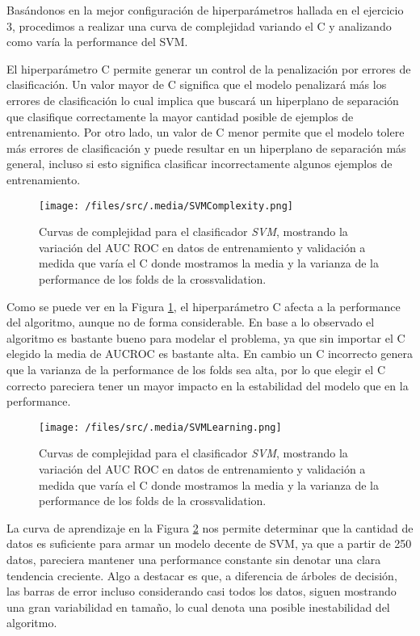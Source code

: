Basándonos en la mejor configuración de hiperparámetros hallada en el ejercicio 3, procedimos a realizar una curva de complejidad variando el C y analizando como varía la performance del SVM. 

El hiperparámetro C permite generar un control de la penalización por errores de clasificación. Un valor mayor de C significa que el modelo penalizará más los errores de clasificación lo cual implica que buscará un hiperplano de separación que clasifique correctamente la mayor cantidad posible de ejemplos de entrenamiento. Por otro lado, un valor de C menor permite que el modelo tolere más errores de clasificación y puede resultar en un hiperplano de separación más general, incluso si esto significa clasificar incorrectamente algunos ejemplos de entrenamiento.

\begin{figure}[!htbp] 
    \centering
    \texttt{[image: /files/src/.media/SVMComplexity.png]}
    \caption{Curvas de complejidad para el clasificador \textit{SVM}, mostrando la variación del AUC ROC en datos de entrenamiento y validación a medida que varía el C donde mostramos la media y la varianza de la performance de los folds de la crossvalidation.}
    \label{SVMComplexity}
\end{figure}

Como se puede ver en la Figura \ref{SVMComplexity}, el hiperparámetro C afecta a la performance del algoritmo, aunque no de forma considerable. En base a lo observado el algoritmo es bastante bueno para modelar el problema, ya que sin importar el C elegido la media de AUCROC es bastante alta. En cambio un C incorrecto genera que la varianza de la performance de los folds sea alta, por lo que elegir el C correcto pareciera tener un mayor impacto en la estabilidad del modelo que en la performance.

\begin{figure}[!htbp]
    \centering
    \texttt{[image: /files/src/.media/SVMLearning.png]}
    \caption{Curvas de complejidad para el clasificador \textit{SVM}, mostrando la variación del AUC ROC en datos de entrenamiento y validación a medida que varía el C donde mostramos la media y la varianza de la performance de los folds de la crossvalidation.}
    \label{SVMLearning}
\end{figure}

La curva de aprendizaje en la Figura \ref{SVMLearning} nos permite determinar que la cantidad de datos es suficiente para armar un modelo decente de SVM, ya que a partir de 250 datos, pareciera mantener una performance constante sin denotar una clara tendencia creciente. Algo a destacar es que, a diferencia de árboles de decisión, las barras de error incluso considerando casi todos los datos, siguen mostrando una gran variabilidad en tamaño, lo cual denota una posible inestabilidad del algoritmo.

